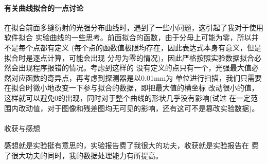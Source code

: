 \documentclass[a4paper]{ctexart}
\makeatletter
\renewcommand{\section}{\@startsection{section}{1}{0mm}
	{-\baselineskip}{0.5\baselineskip}{\bf\leftline}}
\makeatother
\begin{document}
    \paragraph{有关曲线拟合的一点讨论}
    在拟合前面多缝衍射的光强分布曲线时，遇到了一些小问题，这引起了我对于使用软件拟合
    实验曲线的一些思考。前面拟合的函数，由于分母上可能为零，所以并不是每个点都有定义
    (每个点的函数值极限均存在，因此表达式本身有意义，但是拟合时是逐点计算，可能会出现
    分母为零的情况)，因此严格按照实验数据拟合必然会出现程序报错的情况。考虑到这样的
    没有定义的点只有一个，光强最大值必然对应函数的奇异点，再考虑到探测器是以0.01mm为
    单位进行扫描，我们只需要在拟合时微小地改变一下参与拟合的数据，即把最大值的横坐标
    改动很小的值，这样就可以避免0的出现，同时对于整个曲线的形状几乎没有影响(试过
    在一定范围内改动值，对于图像和残差图均无可见的影响，还有这可不是篡改实验数据)。\\
    \\
    \section{\large{收获与感想}}
    \par 
    感想就是实验挺有意思的，实验报告费了我很大的功夫，收获就是实验报告在
    费了很大功夫的同时，我的数据处理能力有所提高。
\end{document}
